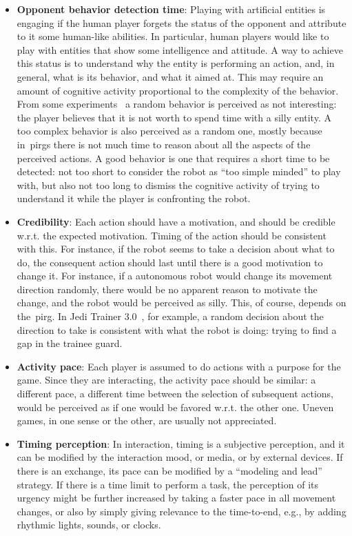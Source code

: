 \begin{itemize}
\item \textbf{Opponent behavior detection time}: Playing with artificial entities is engaging if the human player forgets the status of the opponent and attribute to it some human-like abilities. In particular, human players would like to play with entities that show some intelligence and attitude. A way to achieve this status is to understand why the entity is performing an action, and, in general, what is its behavior, and what it aimed at. This may require an amount of cognitive activity proportional to the complexity of the behavior. From some experiments~\citep{martinoia_physically_2013} a random behavior is perceived as not interesting: the player believes that it is not worth to spend time with a silly entity. A too complex behavior is also perceived as a random one, mostly because in~\glspl{pirg} there is not much time to reason about all the aspects of the perceived actions. A good behavior is one that requires a short time to be detected: not too short to consider the robot as ``too simple minded'' to play with, but also not too long to dismiss the cognitive activity of trying to understand it while the player is confronting the robot.

\item \textbf{Credibility}: Each action should have a motivation, and should be credible w.r.t. the expected motivation. Timing of the action should be consistent with this. For instance, if the robot seems to take a decision about what to do, the consequent action should last until there is a good motivation to change it. For instance, if a autonomous robot would change its movement direction randomly, there would be no apparent reason to motivate the change, and the robot would be perceived as silly. This, of course, depends on the~\gls{pirg}. In Jedi Trainer 3.0~\citep{martinoia_physically_2013}, for example, a random decision about the direction to take is consistent with what the robot is doing: trying to find a gap in the trainee guard.

\item \textbf{Activity pace}: Each player is assumed to do actions with a purpose for the game. Since they are interacting, the activity pace should be similar: a different pace, a different time between the selection of subsequent actions, would be perceived as if one would be favored w.r.t. the other one. Uneven games, in one sense or the other, are usually not appreciated.

\item \textbf{Timing perception}: In interaction, timing is a subjective perception, and it can be modified by the interaction mood, or media, or by external devices. If there is an exchange, its pace can be modified by a ``modeling and lead'' strategy. If there is a time limit to perform a task, the perception of its urgency might be further increased by taking a faster pace in all movement changes, or also by simply giving relevance to the time-to-end, e.g., by adding rhythmic lights, sounds, or clocks.
\end{itemize}


